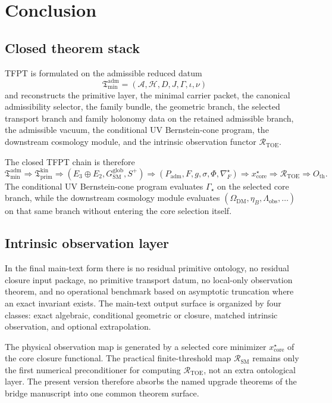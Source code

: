 \documentclass[11pt,a4paper]{article}
\theoremstyle{definition}
\theoremstyle{remark}
\newcommand{\inv}{\iota}
\newcommand{\SM}{\mathrm{SM}}
\newcommand{\Tmin}{\mathfrak T_{\mathrm{min}}}
\newcommand{\Tprim}{\mathfrak T_{\mathrm{prim}}}
\newcommand{\Padm}{P_{\mathrm{adm}}}
\begin{document}
\section{Conclusion}

\subsection{Closed theorem stack}

TFPT is formulated on the admissible reduced datum
\[
\Tmin^{\mathrm{adm}}=(\mathcal A,\mathcal H,D,J,\Gamma,\inv,\nu)
\]
and reconstructs the primitive layer, the minimal carrier packet, the canonical admissibility
selector, the family bundle, the geometric branch, the selected transport branch and family
holonomy data on the retained admissible branch, the admissible vacuum, the conditional UV
Bernstein-cone program, the downstream cosmology module, and the intrinsic observation functor
$\mathcal R_{\mathrm{TOE}}$.

The closed TFPT chain is therefore
\[
\Tmin^{\mathrm{adm}}
\Rightarrow
\Tprim^{\mathrm{kin}}
\Rightarrow
(E_3\oplus E_2,G_{\mathrm{SM}}^{\mathrm{glob}},S^+)
\Rightarrow
(\Padm,F,g,\sigma,\Phi,\nabla_F^\star)
\Rightarrow
x_{\mathrm{core}}^\star
\Rightarrow
\mathcal R_{\mathrm{TOE}}
\Rightarrow
O_{\mathrm{th}}.
\]
The conditional UV Bernstein-cone program evaluates $\Gamma_\star$ on the selected core branch,
while the downstream cosmology module evaluates
$(\Omega_{\mathrm{DM}},\eta_B,\Lambda_{\mathrm{obs}},\ldots)$ on that same branch without
entering the core selection itself.

\subsection{Intrinsic observation layer}

In the final main-text form there is no residual primitive ontology, no residual closure input
package, no primitive transport datum, no local-only observation theorem, and no operational
benchmark based on asymptotic truncation where an exact invariant exists. The main-text output
surface is organized by four classes: exact algebraic, conditional geometric or closure, matched
intrinsic observation, and optional extrapolation.

The physical observation map is generated by a selected core minimizer
$x_{\mathrm{core}}^\star$ of the core closure functional. The practical finite-threshold map $\mathcal R_{\SM}$ remains only the first
numerical preconditioner for computing $\mathcal R_{\mathrm{TOE}}$, not an extra ontological
layer. The present version therefore absorbs the named upgrade theorems of the bridge manuscript
into one common theorem surface.
\end{document}
